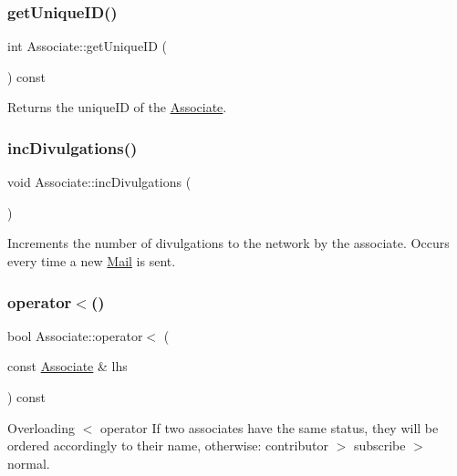 \subsubsection{\texorpdfstring{get\+Unique\+I\+D()}{getUniqueID()}}
{\footnotesize\ttfamily int Associate\+::get\+Unique\+ID (\begin{DoxyParamCaption}{ }\end{DoxyParamCaption}) const}



Returns the unique\+ID of the \mbox{\hyperlink{classAssociate}{Associate}}. 

\mbox{\label{classAssociate_a5d298ea460b494edc46c015af7e1a932}} 
\subsubsection{\texorpdfstring{inc\+Divulgations()}{incDivulgations()}}
{\footnotesize\ttfamily void Associate\+::inc\+Divulgations (\begin{DoxyParamCaption}{ }\end{DoxyParamCaption})}



Increments the number of divulgations to the network by the associate. Occurs every time a new \mbox{\hyperlink{classMail}{Mail}} is sent. 

\mbox{\label{classAssociate_a169cbe6746295386254610c7c9811085}} 
\subsubsection{\texorpdfstring{operator$<$()}{operator<()}}
{\footnotesize\ttfamily bool Associate\+::operator$<$ (\begin{DoxyParamCaption}\item[{const \mbox{\hyperlink{classAssociate}{Associate}} \&}]{lhs }\end{DoxyParamCaption}) const}



Overloading $<$ operator If two associates have the same status, they will be ordered accordingly to their name, otherwise\+: contributor $>$ subscribe $>$ normal. 

